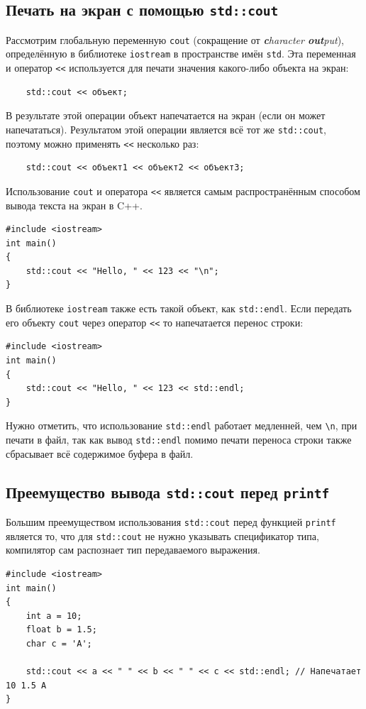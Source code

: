 \documentclass{article}
\begin{document}
\subsection*{Печать на экран с помощью \texttt{std::cout}}
Рассмотрим глобальную переменную \texttt{cout} (сокращение от \textit{\textbf{c}haracter \textbf{out}put}), определённую в библиотеке \texttt{iostream} в пространстве имён \texttt{std}. Эта переменная и оператор \texttt{<{}<} используется для печати значения какого-либо объекта на экран:
\begin{verbatim}
    std::cout << объект;
\end{verbatim}
В результате этой операции объект напечатается на экран (если он может напечататься).
Результатом этой операции является всё тот же \texttt{std::cout}, поэтому можно применять \texttt{<{}<} несколько раз:
\begin{verbatim}
    std::cout << объект1 << объект2 << объект3;
\end{verbatim}
Использование \texttt{cout} и оператора \texttt{<{}<} является самым распространённым способом вывода текста на экран в C++.
\begin{lstlisting}
#include <iostream>
int main() 
{
    std::cout << "Hello, " << 123 << "\n";
}
\end{lstlisting}
В библиотеке \texttt{iostream} также есть такой объект, как \texttt{std::endl}. Если передать его объекту \texttt{cout} через оператор \texttt{<{}<} то напечатается перенос строки:
\begin{lstlisting}
#include <iostream>
int main() 
{
    std::cout << "Hello, " << 123 << std::endl;
}
\end{lstlisting}
Нужно отметить, что использование \texttt{std::endl} работает медленней, чем \texttt{\textbackslash n}, при печати в файл, так как вывод \texttt{std::endl} помимо печати переноса строки также сбрасывает всё содержимое буфера в файл.

\subsection*{Преемущество вывода \texttt{std::cout} перед \texttt{printf}}
Большим преемуществом использования \texttt{std::cout} перед функцией \texttt{printf} является то, что для \texttt{std::cout} не нужно указывать спецификатор типа, компилятор сам распознает тип передаваемого выражения.
\begin{lstlisting}
#include <iostream>
int main() 
{
    int a = 10;
    float b = 1.5;
    char c = 'A';
    
    std::cout << a << " " << b << " " << c << std::endl; // Напечатает 10 1.5 A
}
\end{lstlisting}
\end{document}
